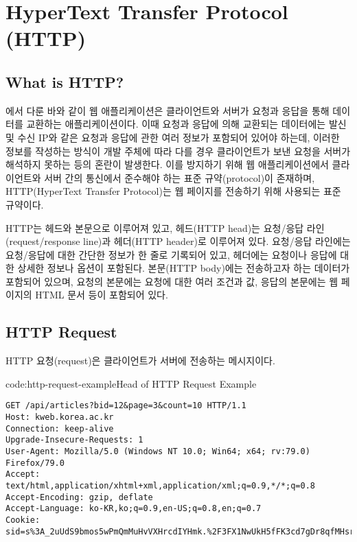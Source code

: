 \section{HyperText Transfer Protocol (HTTP)}\label{sect:http}

\subsection*{What is HTTP?}

에서 다룬 바와 같이 웹 애플리케이션은 클라이언트와 서버가 요청과 응답을 통해 데이터를 교환하는 애플리케이션이다. 이때 요청과 응답에 의해 교환되는 데이터에는 발신 및 수신 IP와 같은 요청과 응답에 관한 여러 정보가 포함되어 있어야 하는데, 이러한 정보를 작성하는 방식이 개발 주체에 따라 다를 경우 클라이언트가 보낸 요청을 서버가 해석하지 못하는 등의 혼란이 발생한다. 이를 방지하기 위해 웹 애플리케이션에서 클라이언트와 서버 간의 통신에서 준수해야 하는 표준 규약(protocol)이 존재하며, HTTP(HyperText Transfer Protocol)는 웹 페이지를 전송하기 위해 사용되는 표준 규약이다.

HTTP는 헤드와 본문으로 이루어져 있고, 헤드(HTTP head)는 요청/응답 라인(request/response line)과 헤더(HTTP header)로 이루어져 있다. 요청/응답 라인에는 요청/응답에 대한 간단한 정보가 한 줄로 기록되어 있고, 헤더에는 요청이나 응답에 대한 상세한 정보나 옵션이 포함된다. 본문(HTTP body)에는 전송하고자 하는 데이터가 포함되어 있으며, 요청의 본문에는 요청에 대한 여러 조건과 값, 응답의 본문에는 웹 페이지의 HTML 문서 등이 포함되어 있다.

\subsection*{HTTP Request}

HTTP 요청(request)은 클라이언트가 서버에 전송하는 메시지이다.

\begin{code}{code:http-request-example}{Head of HTTP Request Example}
\begin{verbatim}
GET /api/articles?bid=12&page=3&count=10 HTTP/1.1
Host: kweb.korea.ac.kr
Connection: keep-alive
Upgrade-Insecure-Requests: 1
User-Agent: Mozilla/5.0 (Windows NT 10.0; Win64; x64; rv:79.0) Firefox/79.0
Accept: text/html,application/xhtml+xml,application/xml;q=0.9,*/*;q=0.8
Accept-Encoding: gzip, deflate
Accept-Language: ko-KR,ko;q=0.9,en-US;q=0.8,en;q=0.7
Cookie: sid=s%3A_2uUdS9bmos5wPmQmMuHvVXHrcdIYHmk.%2F3FX1NwUkH5fFK3cd7gDr8qfMHsrvfMW
\end{verbatim}
\end{code}

